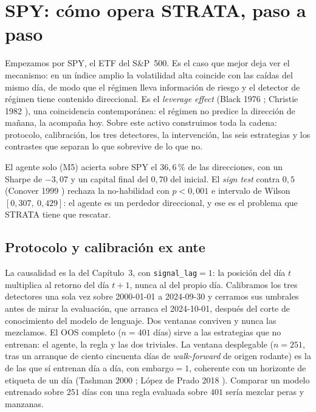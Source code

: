 \section{SPY: cómo opera STRATA, paso a paso}
\label{sec:mp-spy}


Empezamos por SPY, el ETF del S\&P~500. Es el caso que mejor deja ver el mecanismo: en un índice amplio la volatilidad alta coincide con las caídas del mismo día, de modo que el régimen lleva información de riesgo y el detector de régimen tiene contenido direccional. Es el \emph{leverage effect} (Black 1976 \cite{black1976}; Christie 1982 \cite{christie1982}), una coincidencia contemporánea: el régimen no predice la dirección de mañana, la acompaña hoy. Sobre este activo construimos toda la cadena: protocolo, calibración, los tres detectores, la intervención, las seis estrategias y los contrastes que separan lo que sobrevive de lo que no.

El agente solo (M5) acierta sobre SPY el $36{,}6\,\%$ de las direcciones, con un Sharpe de $-3{,}07$ y un capital final del $0{,}70$ del inicial. El \emph{sign test} contra $0{,}5$ (Conover 1999 \cite{conover1999}) rechaza la no-habilidad con $p < 0{,}001$ e intervalo de Wilson $[0{,}307,\ 0{,}429]$: el agente es un perdedor direccional, y ese es el problema que STRATA tiene que rescatar.

\subsection{Protocolo y calibración ex ante}
\label{sec:mp-spy-protocolo}

La causalidad es la del Capítulo~3, con \texttt{signal\_lag}${}=1$: la posición del día $t$ multiplica al retorno del día $t+1$, nunca al del propio día. Calibramos los tres detectores una sola vez sobre 2000-01-01 a 2024-09-30 y cerramos sus umbrales antes de mirar la evaluación, que arranca el 2024-10-01, después del corte de conocimiento del modelo de lenguaje. Dos ventanas conviven y nunca las mezclamos. El OOS completo ($n = 401$ días) sirve a las estrategias que no entrenan: el agente, la regla y las dos triviales. La ventana desplegable ($n = 251$, tras un arranque de ciento cincuenta días de \emph{walk-forward} de origen rodante) es la de las que sí entrenan día a día, con embargo${}=1$, coherente con un horizonte de etiqueta de un día (Tashman 2000 \cite{tashman2000}; López de Prado 2018 \cite{lopezdeprado2018}). Comparar un modelo entrenado sobre $251$ días con una regla evaluada sobre $401$ sería mezclar peras y manzanas.

